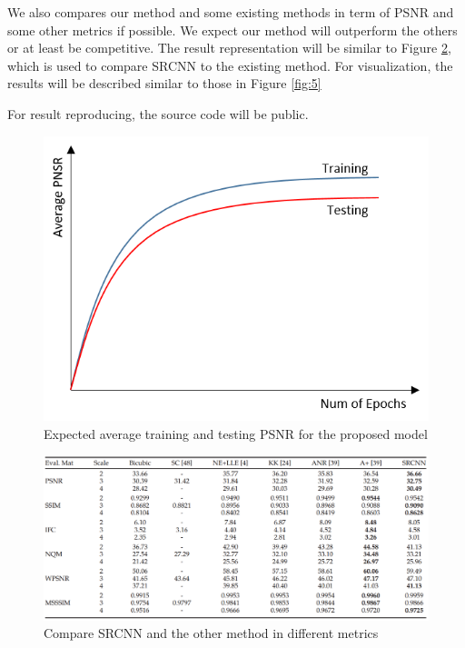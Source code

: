 \documentclass[10pt]{article}
\begin{document}
\noindent
We also compares our method and some existing methods in term of PSNR and some other metrics if possible. We expect our method will outperform the others or at least be competitive. The result representation will be similar to Figure \ref{fig:4}, which is used to compare SRCNN \cite{dong2016image} to the existing method. For visualization, the results will be described similar to those in Figure \ref{fig:5}

\noindent
For result reproducing, the source code will be public. 
\begin{figure}[H]
	\centering
	\includegraphics[scale=0.9]{figs/expectedPSNR.png}
	\caption{Expected average training and testing PSNR for the proposed model}
	\label{fig:3}
\end{figure}


\begin{figure}[H]
	\centering
	\includegraphics[scale=0.4]{figs/PSNR_table.png}
	\caption{Compare SRCNN and the other method in different metrics}
	\label{fig:4}
\end{figure}
\end{document}
